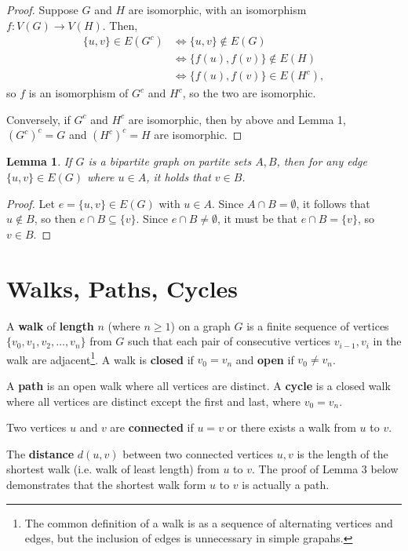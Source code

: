 \documentclass[a4paper,12pt]{article}
\newtheorem{lemma}{Lemma}
\begin{document}
\begin{proof}
Suppose $G$ and $H$ are isomorphic, with an isomorphism $f : V(G) \to V(H)$.
Then,
\begin{align*}
\{u, v\} \in E(G^c)
& \iff \{u, v\} \not\in E(G) \\
& \iff \{f(u), f(v)\} \not\in E(H) \\
& \iff \{f(u), f(v)\} \in E(H^c),
\end{align*}
so $f$ is an isomorphism of $G^c$ and $H^c$, so the two are isomorphic.

Conversely, if $G^c$ and $H^c$ are isomorphic, then by above and Lemma 1,
$(G^c)^c = G$ and $(H^c)^c = H$ are isomorphic.
\end{proof}

\begin{lemma}
If $G$ is a bipartite graph on partite sets $A, B$, then for any edge
$\{u,v\} \in E(G)$ where $u \in A$, it holds that $v \in B$.
\end{lemma}

\begin{proof}
Let $e = \{u,v\} \in E(G)$ with $u \in A$. Since $A \cap B = \emptyset$, it
follows that $u \not\in B$, so then $e \cap B \subseteq \{v\}$.
Since $e \cap B \neq \emptyset$, it must be that $e \cap B = \{v\}$, so
$v \in B$.
\end{proof}

\section{Walks, Paths, Cycles}

A {\bf walk} of {\bf length} $n$ (where $n \geq 1$)
on a graph $G$ is a finite sequence of vertices
$\{v_0, v_1, v_2, \dots, v_n\}$ from $G$ such that
each pair of consecutive vertices $v_{i-1},v_i$ in the walk are adjacent\footnote{
The common definition of a walk is as a sequence of alternating vertices and
edges, but the inclusion of edges is unnecessary in simple grapahs.}.
A walk is {\bf closed} if $v_0 = v_n$ and {\bf open} if $v_0 \neq v_n$.

A {\bf path} is an open walk where all vertices are distinct.
A {\bf cycle} is a closed walk where all vertices are distinct except the first
and last, where $v_0 = v_n$.

Two vertices $u$ and $v$ are {\bf connected} if $u = v$ or
there exists a walk from $u$ to $v$.

The {\bf distance} $d(u, v)$ between two connected vertices $u, v$ is the length
of the shortest walk (i.e. walk of least length) from $u$ to $v$. The proof of
Lemma 3 below demonstrates that the shortest walk form $u$ to $v$ is actually a
path.
\end{document}
